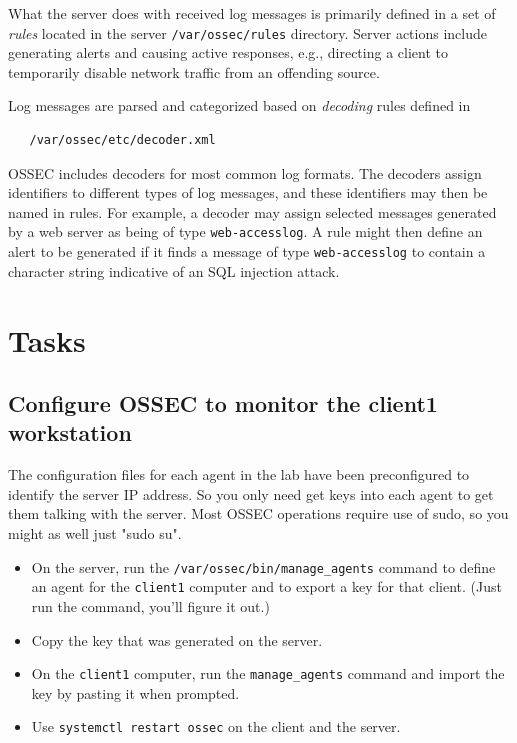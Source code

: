 What the server does with received log messages is primarily defined in a set of \textit{rules} located in the 
server {\tt /var/ossec/rules} 
directory.  Server actions include generating alerts and causing active responses, e.g., directing a client to temporarily disable
network traffic from an offending source.  

Log messages are parsed and categorized based on \textit{decoding} rules defined in 
\begin{verbatim}
   /var/ossec/etc/decoder.xml
\end{verbatim}
\noindent OSSEC includes decoders for most common log formats.  The decoders assign identifiers to different types of log messages,
and these identifiers may then be named in rules.  For example, a decoder may assign selected messages generated by a web
server as being of type {\tt web-accesslog}.  A rule might then define an alert to be generated if it finds a message of 
type {\tt web-accesslog} to contain a character string indicative of an SQL injection attack. 

\section{Tasks}

\subsection{Configure OSSEC to monitor the client1 workstation}
The configuration files for each agent in the lab have been preconfigured to identify the server IP address.  So you only need
get keys into each agent to get them talking with the server.
Most OSSEC operations require use of sudo, so you might as well just "sudo su".
\begin{itemize}
\item On the server, run the {\tt /var/ossec/bin/manage\_agents} command to define an agent for the {\tt client1} computer and
to export a key for that client. (Just run the command, you'll figure it out.)
\item Copy the key that was generated on the server.
\item On the {\tt client1} computer, run the {\tt manage\_agents} command and import the key by pasting it when prompted.
\item Use {\tt systemctl restart ossec} on the client and the server.  
\end{itemize}

